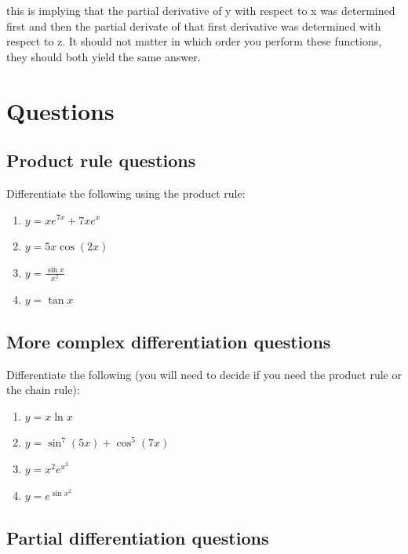 \documentclass[
]{book}
\providecommand{\tightlist}{%
  \setlength{\itemsep}{0pt}\setlength{\parskip}{0pt}}
\begin{document}
this is implying that the partial derivative of y with respect to x was determined first and then the partial derivate of that first derivative was determined with respect to z. It should not matter in which order you perform these functions, they should both yield the same answer.

\hypertarget{sec:Questions5}{%
\section{Questions}\label{sec:Questions5}}

\hypertarget{product-rule-questions}{%
\subsection{Product rule questions}\label{product-rule-questions}}

Differentiate the following using the product rule:

\begin{enumerate}
\def\labelenumi{\arabic{enumi}.}
\tightlist
\item
  \(y = x e^{7x}+ 7xe^x\)
\item
  \(y = 5x \cos (2x)\)
\item
  \(y = \frac{\sin x}{x^2}\)
\item
  \(y = \tan x\)
\end{enumerate}

\hypertarget{more-complex-differentiation-questions}{%
\subsection{More complex differentiation questions}\label{more-complex-differentiation-questions}}

Differentiate the following (you will need to decide if you need the product rule or the chain rule):

\begin{enumerate}
\def\labelenumi{\arabic{enumi}.}
\tightlist
\item
  \(y = x \ln x\)
\item
  \(y = \sin ^7 (5x)+ \cos ^5 (7x)\)
\item
  \(y = x^2 e^{x^2}\)
\item
  \(y = e^{\sin x^2}\)
\end{enumerate}

\hypertarget{partial-differentiation-questions}{%
\subsection{Partial differentiation questions}\label{partial-differentiation-questions}}
\end{document}
